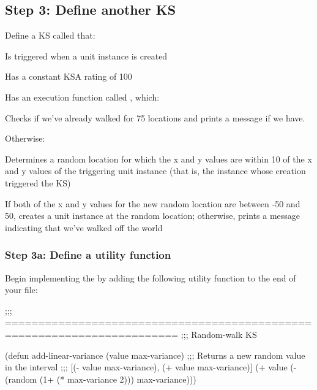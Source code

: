 \documentclass[10pt,twoside,english,pdftex]{article}
\begin{document}
\subsection*{Step 3: Define another KS}

Define a KS called  that:

\begin{tightitemize}
\item Is triggered when a  unit instance is created
\item Has a constant KSA rating of 100
\item Has an execution function called , which:
\begin{tightitemize}
\item Checks if we've already walked for 75 locations and prints a message if
  we have. 
\item Otherwise:
\begin{tightitemize}
\item Determines a random location for which the x and y values are within 10
  of the x and y values of the triggering unit instance (that is, the
   instance whose creation triggered the 
  KS)
\item If both of the x and y values for the new random location are between
  -50 and 50, creates a  unit instance at the random location;
  otherwise, prints a message indicating that we've walked off the world
\end{tightitemize}
\end{tightitemize}
\end{tightitemize}

\subsubsection*{Step 3a: Define a utility function}

Begin implementing the  by adding the following
utility function to the end of your  file:

\begin{example}
  ;;; ========================================================================
  ;;;   Random-walk KS

  (defun add-linear-variance (value max-variance)
    ;;; Returns a new random value in the interval
    ;;; [(- value max-variance), (+ value max-variance)]
    (+ value (- (random (1+ (* max-variance 2))) max-variance)))
\end{example}
\end{document}
